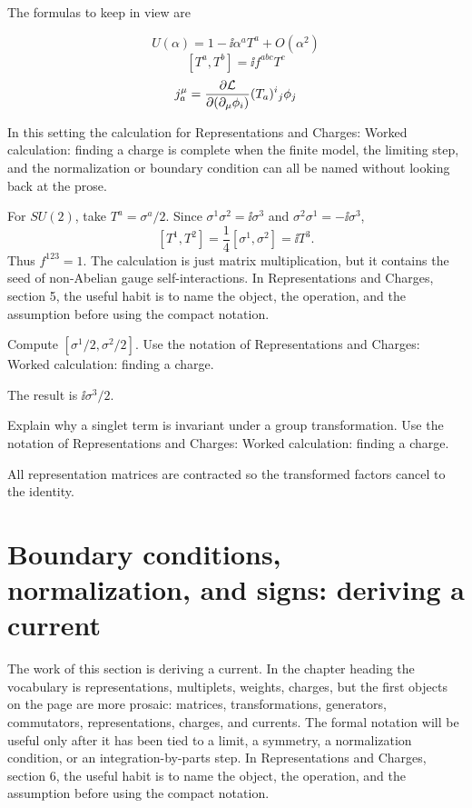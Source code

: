 The formulas to keep in view are

\[
  U(\alpha)=1-\ii\alpha^aT^a+O(\alpha^2)
\]
\[
  [T^a,T^b]=\ii f^{abc}T^c
\]
\[
  j^\mu_a=\frac{\partial\mathcal L}{\partial(\partial_\mu\phi_i)}(T_a)^i{}_j\phi_j
\]

In this setting the calculation for Representations and Charges: Worked calculation: finding a charge is complete when the finite model, the limiting step, and the normalization or boundary condition can all be named without looking back at the prose.




\begin{example}
For \(SU(2)\), take \(T^a=\sigma^a/2\).  Since \(\sigma^1\sigma^2=\ii\sigma^3\) and \(\sigma^2\sigma^1=-\ii\sigma^3\),
\[
  [T^1,T^2]=\frac14[\sigma^1,\sigma^2]=\ii T^3.
\]
Thus \(f^{123}=1\).  The calculation is just matrix multiplication, but it contains the seed of non-Abelian gauge self-interactions.  In Representations and Charges, section 5, the useful habit is to name the object, the operation, and the assumption before using the compact notation.
\end{example}



\begin{exercise}
Compute \([\sigma^1/2,\sigma^2/2]\).  Use the notation of Representations and Charges: Worked calculation: finding a charge.
\begin{answer}
The result is \(\ii\sigma^3/2\).
\end{answer}
\end{exercise}

\begin{exercise}
Explain why a singlet term is invariant under a group transformation.  Use the notation of Representations and Charges: Worked calculation: finding a charge.
\begin{answer}
All representation matrices are contracted so the transformed factors cancel to the identity.
\end{answer}
\end{exercise}



\section{Boundary conditions, normalization, and signs: deriving a current}

The work of this section is deriving a current.  In the chapter heading the vocabulary is representations, multiplets, weights, charges, but the first objects on the page are more prosaic: matrices, transformations, generators, commutators, representations, charges, and currents.  The formal notation will be useful only after it has been tied to a limit, a symmetry, a normalization condition, or an integration-by-parts step.  In Representations and Charges, section 6, the useful habit is to name the object, the operation, and the assumption before using the compact notation.

